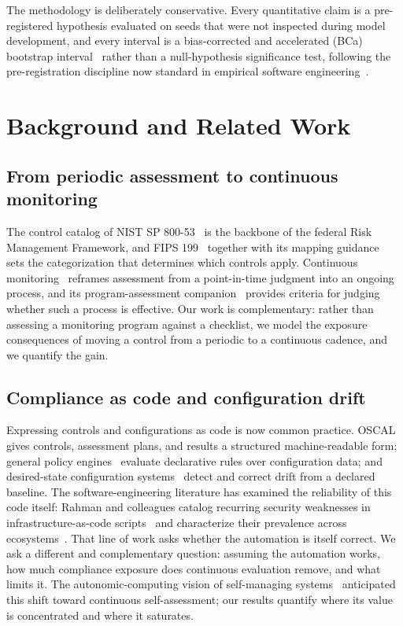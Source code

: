 \documentclass[journal]{IEEEtran}
\begin{document}
The methodology is deliberately conservative. Every quantitative claim is a pre-registered
hypothesis evaluated on seeds that were not inspected during model development, and every interval
is a bias-corrected and accelerated (BCa) bootstrap interval~\cite{efron1987bca,efron1994introduction}
rather than a null-hypothesis significance test, following the pre-registration discipline now
standard in empirical software engineering~\cite{wohlin2012experimentation}.

\section{Background and Related Work}

\subsection{From periodic assessment to continuous monitoring}
The control catalog of NIST SP 800-53~\cite{nist80053} is the backbone of the federal Risk
Management Framework, and FIPS 199~\cite{fips199} together with its mapping
guidance~\cite{nist80060} sets the categorization that determines which controls apply. Continuous
monitoring~\cite{nist80137} reframes assessment from a point-in-time judgment into an ongoing
process, and its program-assessment companion~\cite{nist80137a} provides criteria for judging
whether such a process is effective. Our work is complementary: rather than assessing a monitoring
program against a checklist, we model the exposure consequences of moving a control from a periodic
to a continuous cadence, and we quantify the gain.

\subsection{Compliance as code and configuration drift}
Expressing controls and configurations as code is now common practice. OSCAL~\cite{oscal} gives
controls, assessment plans, and results a structured machine-readable form; general policy
engines~\cite{opa} evaluate declarative rules over configuration data; and desired-state
configuration systems~\cite{powershelldsc} detect and correct drift from a declared baseline. The
software-engineering literature has examined the reliability of this code itself: Rahman and
colleagues catalog recurring security weaknesses in infrastructure-as-code
scripts~\cite{rahman2019seven} and characterize their prevalence across ecosystems~\cite{rahman2021different}.
That line of work asks whether the automation is itself correct. We ask a different and
complementary question: assuming the automation works, how much compliance exposure does
continuous evaluation remove, and what limits it. The autonomic-computing vision of self-managing
systems~\cite{kephart2003vision} anticipated this shift toward continuous self-assessment; our
results quantify where its value is concentrated and where it saturates.
\end{document}
